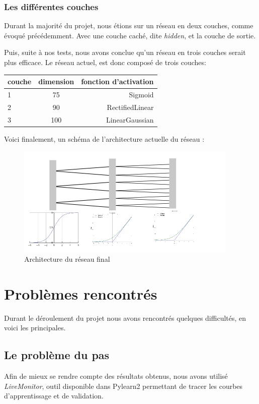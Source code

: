 \documentclass[12pt, a4paper]{article}
\begin{document}
	\subsubsection{Les différentes couches}
	
Durant la majorité du projet, nous étions sur un réseau en deux couches, comme évoqué précédemment. Avec une couche caché, dite \emph{hidden}, et la couche de sortie. 

Puis, suite à nos tests, nous avons conclue qu'un réseau en trois couches serait plus efficace. Le réseau actuel, est donc composé de trois couches: 
\newpage
\begin{center}
\begin{tabular}{|l|c|r|}
  \hline
  couche & dimension & fonction d'activation\\
  \hline
  1 & 75 & Sigmoid \\
  2 & 90 & RectifiedLinear \\
  3 & 100 & LinearGaussian \\
  \hline
\end{tabular}
\end{center}

Voici finalement, un schéma de l'architecture actuelle du réseau :

\begin{figure}[h!]
  \centering
  \includegraphics[scale=1]{Images/architecture.png}
  \caption{Architecture du réseau final}
\end{figure}
\newpage
\section{Problèmes rencontrés}
Durant le déroulement du projet nous avons rencontrés quelques difficultés, en voici les principales. 
	\subsection{Le problème du pas}
Afin de mieux se rendre compte des résultats obtenus, nous avons utilisé \emph{LiveMonitor}, outil disponible dans Pylearn2 permettant de tracer les courbes d'apprentissage et de validation. 
\end{document}
